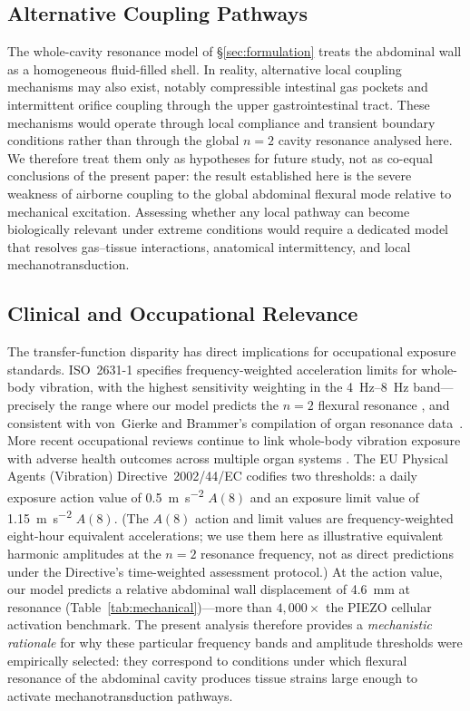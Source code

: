 \subsection{Alternative Coupling Pathways}
\label{sec:disc:alternatives}

The whole-cavity resonance model of \S\ref{sec:formulation} treats the
abdominal wall as a homogeneous fluid-filled shell.  In reality, alternative
local coupling mechanisms may also exist, notably compressible intestinal gas
pockets and intermittent orifice coupling through the upper
gastrointestinal tract.  These mechanisms would operate through local
compliance and transient boundary conditions rather than through the global
$n=2$ cavity resonance analysed here.  We therefore treat them only as
hypotheses for future study, not as co-equal conclusions of the present paper:
the result established here is the severe weakness of airborne coupling to the
global abdominal flexural mode relative to mechanical excitation.  Assessing
whether any local pathway can become biologically relevant under extreme
conditions would require a dedicated model that resolves gas--tissue
interactions, anatomical intermittency, and local mechanotransduction.

\subsection{Clinical and Occupational Relevance}
\label{sec:disc:clinical}

The transfer-function disparity has direct implications for occupational exposure
standards.  ISO~2631-1 specifies frequency-weighted acceleration limits for
whole-body vibration, with the highest sensitivity weighting in the
\SIrange{4}{8}{\hertz} band---precisely the range where our model predicts
the $n = 2$ flexural resonance \cite{iso2631}, and consistent with
von~Gierke and Brammer's compilation of organ resonance
data~\cite{vonGierke2002}.  More recent occupational reviews continue to link
whole-body vibration exposure with adverse health outcomes across multiple
organ systems \cite{Krajnak2018}.  The EU Physical Agents
(Vibration) Directive~2002/44/EC codifies two thresholds: a daily exposure
action value of \SI{0.5}{\metre\per\second\squared} $A(8)$ and an exposure
limit value of \SI{1.15}{\metre\per\second\squared} $A(8)$.  (The $A(8)$
action and limit values are frequency-weighted eight-hour equivalent
accelerations; we use them here as illustrative equivalent harmonic
amplitudes at the $n{=}2$ resonance frequency, not as direct predictions
under the Directive's time-weighted assessment protocol.)  At the action
value, our model predicts a relative abdominal wall displacement of
\SI{4.6}{\milli\metre} at resonance (Table~\ref{tab:mechanical})---more than
$4{,}000\times$ the PIEZO cellular activation benchmark.  The present analysis
therefore provides a \emph{mechanistic rationale} for why these particular
frequency bands and amplitude thresholds were empirically selected: they
correspond to conditions under which flexural resonance of the abdominal
cavity produces tissue strains large enough to activate
mechanotransduction pathways.

